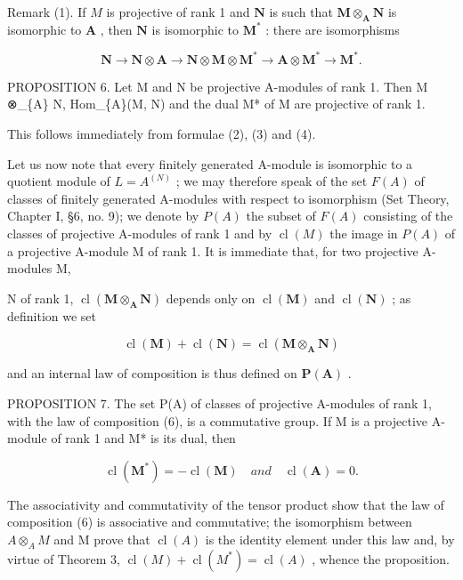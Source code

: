 Remark (1). If \(M\) is projective of rank 1 and \(\mathbf{N}\) is such that \(\mathbf{M} \otimes_{\mathbf{A}} \mathbf{N}\) is isomorphic to \(\mathbf{A}\) , then \(\mathbf{N}\) is isomorphic to \(\mathbf{M}^*\) : there are isomorphisms

\[
\mathbf {N} \rightarrow \mathbf {N} \otimes \mathbf {A} \rightarrow \mathbf {N} \otimes \mathbf {M} \otimes \mathbf {M} ^ {*} \rightarrow \mathbf {A} \otimes \mathbf {M} ^ {*} \rightarrow \mathbf {M} ^ {*}.
\]

PROPOSITION 6. Let M and N be projective A-modules of rank 1. Then M ⊗\_\{A\} N, Hom\_\{A\}(M, N) and the dual M* of M are projective of rank 1.

This follows immediately from formulae (2), (3) and (4).

Let us now note that every finitely generated A-module is isomorphic to a quotient module of \(L = A^{(N)}\) ; we may therefore speak of the set \(F(A)\) of classes of finitely generated A-modules with respect to isomorphism (Set Theory, Chapter I, §6, no. 9); we denote by \(P(A)\) the subset of \(F(A)\) consisting of the classes of projective A-modules of rank 1 and by \(\operatorname{cl}(M)\) the image in \(P(A)\) of a projective A-module M of rank 1. It is immediate that, for two projective A-modules M,

N of rank 1, \(\operatorname{cl}(\mathbf{M} \otimes_{\mathbf{A}} \mathbf{N})\) depends only on \(\operatorname{cl}(\mathbf{M})\) and \(\operatorname{cl}(\mathbf{N})\) ; as definition we set

\[
\operatorname{cl} (\mathbf {M}) + \operatorname{cl} (\mathbf {N}) = \operatorname{cl} (\mathbf {M} \otimes_ {\mathbf {A}} \mathbf {N})\tag{6}
\]

and an internal law of composition is thus defined on \(\pmb{P}(\mathbf{A})\) .

PROPOSITION 7. The set P(A) of classes of projective A-modules of rank 1, with the law of composition (6), is a commutative group. If M is a projective A-module of rank 1 and M* is its dual, then

\[
\operatorname{cl} (\mathbf {M} ^ {*}) = - \operatorname{cl} (\mathbf {M}) \quad a n d \quad \operatorname{cl} (\mathbf {A}) = 0.\tag{7}
\]

The associativity and commutativity of the tensor product show that the law of composition (6) is associative and commutative; the isomorphism between \(A \otimes_{A} M\) and M prove that \(\operatorname{cl}(A)\) is the identity element under this law and, by virtue of Theorem 3, \(\operatorname{cl}(M) + \operatorname{cl}(M^{*}) = \operatorname{cl}(A)\) , whence the proposition.

